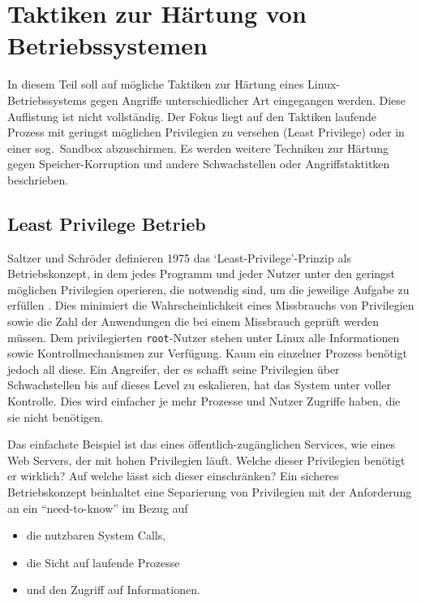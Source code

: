 
\chapter{Taktiken zur Härtung von Betriebssystemen}


In diesem Teil soll auf mögliche Taktiken zur Härtung eines Linux-Betriebssystems gegen Angriffe unterschiedlicher Art eingegangen werden. Diese Auflistung ist nicht vollständig. Der Fokus liegt auf den Taktiken laufende Prozess mit geringst möglichen Privilegien zu versehen (Least Privilege) oder in einer sog.\ Sandbox abzuschirmen. Es werden weitere Techniken zur Härtung gegen Speicher-Korruption und andere Schwachstellen oder Angriffstaktitken beschrieben.

\section{Least Privilege Betrieb}

Saltzer und Schröder definieren 1975 das `Least-Privilege'-Prinzip als Betriebskonzept, in dem jedes Programm und jeder Nutzer unter den geringst möglichen Privilegien operieren, die notwendig sind, um die jeweilige Aufgabe zu erfüllen \cite{saltzer_1975}. Dies minimiert die Wahrscheinlichkeit eines Missbrauchs von Privilegien sowie die Zahl der Anwendungen die bei einem Missbrauch geprüft werden müssen. 
Dem privilegierten \texttt{root}-Nutzer stehen unter Linux alle Informationen sowie Kontrollmechanismen zur Verfügung. Kaum ein einzelner Prozess benötigt jedoch all diese. Ein Angreifer, der es schafft seine Privilegien über Schwachstellen bis auf dieses Level zu eskalieren, hat das System unter voller Kontrolle. Dies wird einfacher je mehr Prozesse und Nutzer Zugriffe haben, die sie nicht benötigen.

Das einfachste Beispiel ist das eines öffentlich-zugänglichen Services, wie eines Web Servers, der mit hohen Privilegien läuft. Welche dieser Privilegien benötigt er wirklich? Auf welche lässt sich dieser einschränken?
Ein sicheres Betriebskonzept beinhaltet eine Separierung von Privilegien mit der Anforderung an ein ``need-to-know'' im Bezug auf 
\begin{itemize}
  \item die nutzbaren System Calls,
  \item die Sicht auf laufende Prozesse
  \item und den Zugriff auf Informationen.
\end{itemize}


